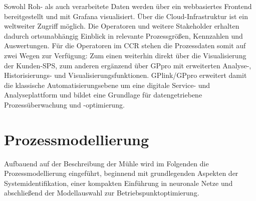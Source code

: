 Sowohl Roh- als auch verarbeitete Daten werden über ein webbasiertes Frontend bereitgestellt und mit Grafana visualisiert. Über die Cloud-Infrastruktur ist ein weltweiter Zugriff möglich. Die Operatoren und weitere Stakeholder erhalten dadurch ortsunabhängig Einblick in relevante Prozessgrößen, Kennzahlen und Auswertungen.
Für die Operatoren im \ac{CCR} stehen die Prozessdaten somit auf zwei Wegen zur Verfügung: Zum einen weiterhin direkt über die Visualisierung der Kunden-\ac{SPS}, zum anderen ergänzend über GPpro mit erweiterten Analyse-, Historisierungs- und Visualisierungsfunktionen. GPlink/GPpro erweitert damit die klassische Automatisierungsebene um eine digitale Service- und Analyseplattform und bildet eine Grundlage für datengetriebene Prozessüberwachung und -optimierung.
%
\section{Prozessmodellierung} \label{sec:modellierung}
Aufbauend auf der Beschreibung der Mühle wird im Folgenden die Prozessmodellierung eingeführt, beginnend mit grundlegenden Aspekten der Systemidentifikation, einer kompakten Einführung in neuronale Netze und abschließend der Modellauswahl zur Betriebspunktoptimierung.
%
